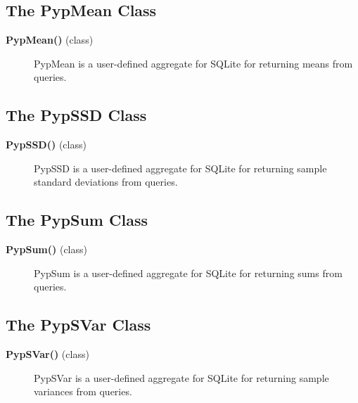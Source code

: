 \subsection*{The PypMean Class}
\begin{description}
\item[\textbf{PypMean()} (class)]
PypMean is a user-defined aggregate for SQLite for returning means from queries.
\end{description}

\subsection*{The PypSSD Class}
\begin{description}
\item[\textbf{PypSSD()} (class)]
PypSSD is a user-defined aggregate for SQLite for returning sample standard deviations from queries.
\end{description}

\subsection*{The PypSum Class}
\begin{description}
\item[\textbf{PypSum()} (class)]
PypSum is a user-defined aggregate for SQLite for returning sums from queries.
\end{description}

\subsection*{The PypSVar Class}
\begin{description}
\item[\textbf{PypSVar()} (class)]
PypSVar is a user-defined aggregate for SQLite for returning sample variances from queries.
\end{description}